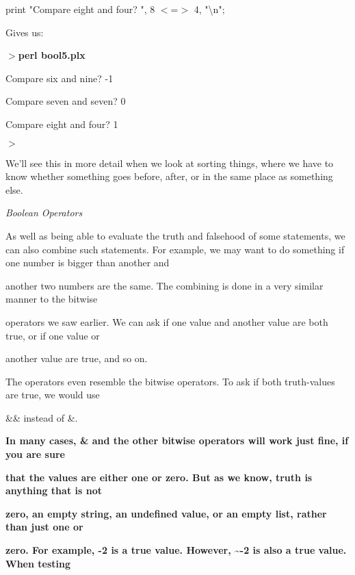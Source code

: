 \documentclass[a4paper,11pt]{book}
\begin{document}
\noindent print "Compare eight and four? ", 8 $<$=$>$ 4, "\textbackslash n";

\noindent 

\noindent Gives us:

\noindent 

\noindent $>$\textbf{perl bool5.plx}

\noindent Compare six and nine? -1

\noindent Compare seven and seven? 0

\noindent Compare eight and four? 1

\noindent $>$

\noindent 

\noindent We'll see this in more detail when we look at sorting things, where we have to know whether something goes before, after, or in the same place as something else.

\noindent 

\noindent \textit{Boolean Operators}

\noindent As well as being able to evaluate the truth and falsehood of some statements, we can also combine such statements. For example, we may want to do something if one number is bigger than another and

\noindent another two numbers are the same. The combining is done in a very similar manner to the bitwise

\noindent operators we saw earlier. We can ask if one value and another value are both true, or if one value or

\noindent another value are true, and so on.

\noindent 

\noindent The operators even resemble the bitwise operators. To ask if both truth-values are true, we would use

\noindent \&\& instead of   \&.

\noindent 

\noindent 

\noindent \textbf{In many cases, \& and the other bitwise operators will work just fine, if you are sure}

\noindent \textbf{that the values are either one or zero. But as we know, truth is anything that is not}

\noindent \textbf{zero, an empty string, an undefined value, or an empty list, rather than just one or}

\noindent \textbf{zero. For example, -2 is a true value. However, \~{}-2 is also a true value. When testing}
\end{document}
